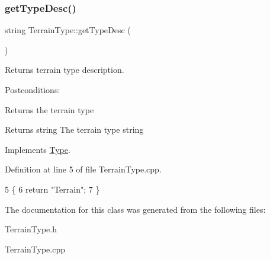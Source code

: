 \subsubsection{\texorpdfstring{get\+Type\+Desc()}{getTypeDesc()}}
{\footnotesize\ttfamily string Terrain\+Type\+::get\+Type\+Desc (\begin{DoxyParamCaption}{ }\end{DoxyParamCaption})\hspace{0.3cm}{\ttfamily [virtual]}}



Returns terrain type description. 

Postconditions\+:
\begin{DoxyItemize}
\item Returns the terrain type
\end{DoxyItemize}

\begin{DoxyReturn}{Returns}
string The terrain type string 
\end{DoxyReturn}


Implements \hyperlink{classType_a5c453300dc060252c30534110bd2f78c}{Type}.



Definition at line 5 of file Terrain\+Type.\+cpp.


\begin{DoxyCode}
5                                 \{
6     \textcolor{keywordflow}{return} \textcolor{stringliteral}{"Terrain"};
7 \}
\end{DoxyCode}


The documentation for this class was generated from the following files\+:\begin{DoxyCompactItemize}
\item 
Terrain\+Type.\+h\item 
Terrain\+Type.\+cpp\end{DoxyCompactItemize}
